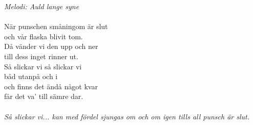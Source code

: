 {\footnotesize\textit{Melodi: Auld lange syne}}\\
\\
När punschen småningom är slut\\
och vår flaska blivit tom.\\
Då vänder vi den upp och ner\\
till dess inget rinner ut.\\
\revrpt Så slickar vi så slickar vi\\
båd utanpå och i\\
och finns det ändå något kvar\\
får det va' till sämre dar.\rpt\\
\\
{\footnotesize\textit{Så slickar vi... kan med fördel sjungas om och om igen tills all punsch är slut.}}
